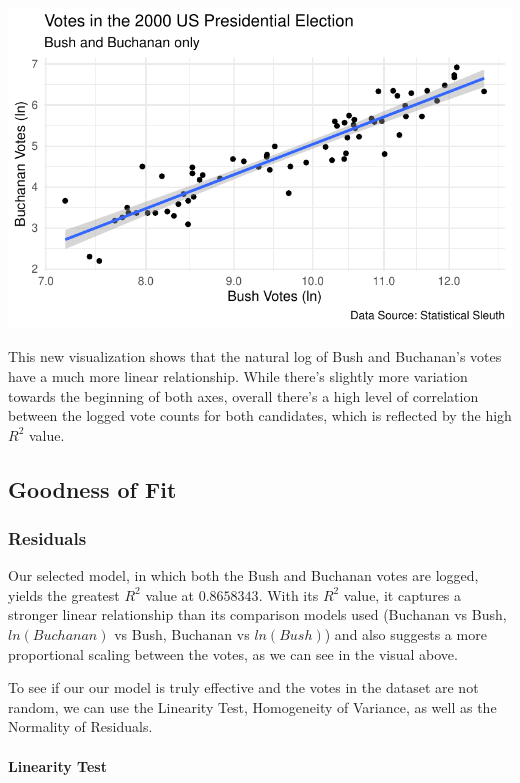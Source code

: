 \documentclass[
  letterpaper,
  DIV=11,
  numbers=noendperiod]{scrartcl}
\let\oldparagraph\paragraph
\renewcommand{\paragraph}[1]{\oldparagraph{#1}\mbox{}}
\begin{document}
\includegraphics{sds-291_s-24_case-study-template_files/figure-pdf/unnamed-chunk-6-1.pdf}

This new visualization shows that the natural log of Bush and Buchanan's
votes have a much more linear relationship. While there's slightly more
variation towards the beginning of both axes, overall there's a high
level of correlation between the logged vote counts for both candidates,
which is reflected by the high \(R^2\) value.

\hypertarget{goodness-of-fit}{%
\subsection{Goodness of Fit}\label{goodness-of-fit}}

\hypertarget{residuals}{%
\subsubsection{Residuals}\label{residuals}}

Our selected model, in which both the Bush and Buchanan votes are
logged, yields the greatest \(R^2\) value at \(0.8658343\). With its
\(R^2\) value, it captures a stronger linear relationship than its
comparison models used (Buchanan vs Bush, \(ln(Buchanan)\) vs Bush,
Buchanan vs \(ln(Bush)\)) and also suggests a more proportional scaling
between the votes, as we can see in the visual above.

To see if our our model is truly effective and the votes in the dataset
are not random, we can use the Linearity Test, Homogeneity of Variance,
as well as the Normality of Residuals.

\hypertarget{linearity-test}{%
\paragraph{Linearity Test}\label{linearity-test}}
\end{document}
